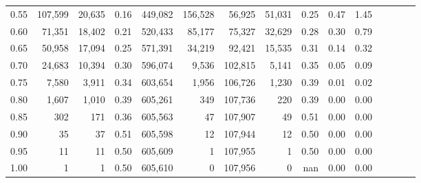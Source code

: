 \begin{tabular}{rrrcrrrrrrrrrrr}
0.55 &  107,599 &  20,635 &                                       0.16 &  449,082 &  156,528 &   56,925 &   51,031 &  0.25 &  0.47 &                         1.45 \\
0.60 &   71,351 &  18,402 &                                       0.21 &  520,433 &   85,177 &   75,327 &   32,629 &  0.28 &  0.30 &                         0.79 \\
0.65 &   50,958 &  17,094 &                                       0.25 &  571,391 &   34,219 &   92,421 &   15,535 &  0.31 &  0.14 &                         0.32 \\
0.70 &   24,683 &  10,394 &                                       0.30 &  596,074 &    9,536 &  102,815 &    5,141 &  0.35 &  0.05 &                         0.09 \\
0.75 &    7,580 &   3,911 &                                       0.34 &  603,654 &    1,956 &  106,726 &    1,230 &  0.39 &  0.01 &                         0.02 \\
0.80 &    1,607 &   1,010 &                                       0.39 &  605,261 &      349 &  107,736 &      220 &  0.39 &  0.00 &                         0.00 \\
0.85 &      302 &     171 &                                       0.36 &  605,563 &       47 &  107,907 &       49 &  0.51 &  0.00 &                         0.00 \\
0.90 &       35 &      37 &                                       0.51 &  605,598 &       12 &  107,944 &       12 &  0.50 &  0.00 &                         0.00 \\
0.95 &       11 &      11 &                                       0.50 &  605,609 &        1 &  107,955 &        1 &  0.50 &  0.00 &                         0.00 \\
1.00 &        1 &       1 &                                       0.50 &  605,610 &        0 &  107,956 &        0 &   nan &  0.00 &                         0.00 \\
\bottomrule
\end{tabular}
